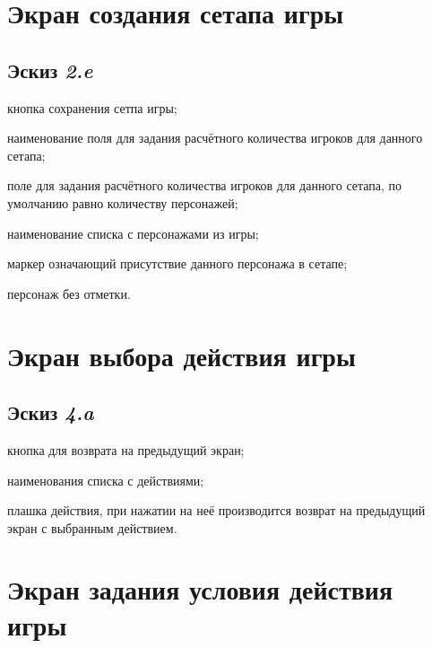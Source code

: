 \section{Экран создания сетапа игры}\label{lbl:game-setup-new}

\subsection{Эскиз \emph{2.e}}
\begin{enumerate*}
    \item кнопка сохранения сетпа игры;
    \item наименование поля для задания расчётного количества игроков для данного сетапа;
    \item поле для задания расчётного количества игроков для данного сетапа, по умолчанию равно количеству персонажей;
    \item наименование списка с персонажами из игры;
    \item маркер означающий присутствие данного персонажа в сетапе;
    \item персонаж без отметки.
\end{enumerate*}

\section{Экран выбора действия игры}\label{lbl:game-action-list}

\subsection{Эскиз \emph{4.a}}
\begin{enumerate*}
    \item кнопка для возврата на предыдущий экран;
    \item наименования списка с действиями;
    \item плашка действия, при нажатии на неё производится возврат на предыдущий экран с выбранным действием.
\end{enumerate*}

\section{Экран задания условия действия игры}\label{lbl:game-action-cond}

